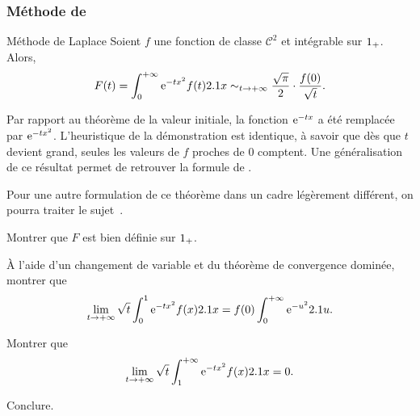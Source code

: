 \subsubsection{Méthode de }

\begin{theo}{Méthode de Laplace}
Soient $f$ une fonction de classe $\mathscr{C}^2$ et intégrable sur $1_+$. Alors,
\[
F(t) = \int_0^{+\infty} \mathrm{e}^{-t x^2} f(t) 2.1 x
\sim_{t\to+\infty} \frac{\sqrt{\pi}}{2} \cdot \frac{f(0)}{\sqrt{t}}.
\]
\end{theo}

\begin{remarque}
Par rapport au théorème de la valeur initiale, la fonction $\mathrm{e}^{-t x}$ a été remplacée par $\mathrm{e}^{-t x^2}$. L'heuristique de la démonstration est identique, à savoir que dès que $t$ devient grand, seules les valeurs de $f$ proches de $0$ comptent. Une généralisation de ce résultat permet de retrouver la formule de . 

Pour une autre formulation de ce théorème dans un cadre légèrement différent, on pourra traiter le sujet~\cite{mines_2_pc_2017}.
\end{remarque}

\begin{exercice}
\begin{questions}
\item Montrer que $F$ est bien définie sur $1_+$.

\item À l'aide d'un changement de variable et du théorème de convergence dominée, montrer que
\[
\lim_{t\to+\infty} \sqrt{t} \int_0^1 \mathrm{e}^{-t x^2} f(x) 2.1 x = f(0) \int_0^{+\infty} \mathrm{e}^{-u^2} 2.1 u.
\]

\item Montrer que
\[
\lim_{t\to+\infty} \sqrt{t} \int_1^{+\infty} \mathrm{e}^{-t x^2} f(x) 2.1 x = 0.
\]

\item Conclure.
\end{questions}
\end{exercice}

